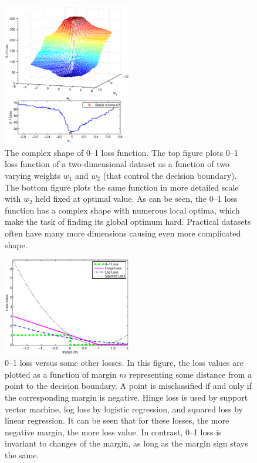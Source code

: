 \begin{figure}[!ht]
\centering
\includegraphics[width=0.50\textwidth]{images/fig14_complexshape.eps}
\caption{
The complex shape of 0--1 loss function. 
The top figure plots 0--1 loss function of a two-dimensional dataset as a function of two varying weights $w_1$ and $w_2$ (that control the decision boundary). The bottom figure plots the same function in more detailed scale with $w_2$ held fixed at optimal value. As can be seen, the 0--1 loss function has a complex shape with numerous local optima, which make the task of finding its global optimum hard. Practical datasets often have many more dimensions causing even more complicated shape.
}
\label{fig:complex_shape}
\end{figure}

\begin{figure}[here]
\centering
\includegraphics[width=0.50\textwidth]{images/fig13_losses.eps}
\caption{
0--1 loss versus some other losses. In this figure, the loss values are plotted as a function of margin $m$ representing some distance from a point to the decision boundary. A point is misclassified if and only if the corresponding margin is negative. Hinge loss is used by support vector machine, log loss by logistic regression, and squared loss by linear regression. It can be seen that for these losses, the more negative margin, the more loss value. In contrast, 0--1 loss is invariant to changes of the margin, as long as the margin sign stays the same.
}
\label{fig:losses}
\end{figure}


